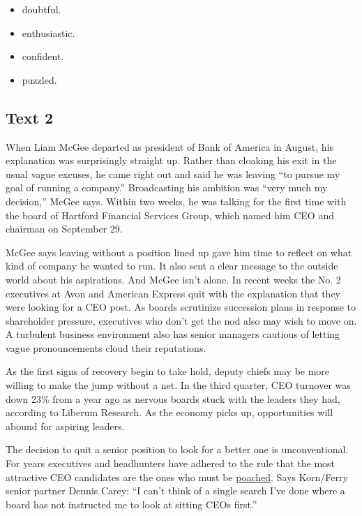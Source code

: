 \documentclass[UTF8,11pt]{ctexart}
\begin{document}
\begin{itemize}[leftmargin=2em,itemsep=.2em,topsep=.4em]\item[A.] doubtful.
\item[B.] enthusiastic.
\item[C.] confident.
\item[D.] puzzled.
\end{itemize}

\subsection*{\textbf{Text 2}}


When Liam McGee departed as president of Bank of America in August, his explanation was surprisingly straight up. Rather than cloaking his exit in the usual vague excuses, he came right out and said he was leaving “to pursue my goal of running a company.” Broadcasting his ambition was “very much my decision,” McGee says. Within two weeks, he was talking for the first time with the board of Hartford Financial Services Group, which named him CEO and chairman on September 29.


McGee says leaving without a position lined up gave him time to reflect on what kind of company he wanted to run. It also sent a clear message to the outside world about his aspirations. And McGee isn't alone. In recent weeks the No. 2 executives at Avon and American Express quit with the explanation that they were looking for a CEO post. As boards scrutinize succession plans in response to shareholder pressure, executives who don't get the nod also may wish to move on. A turbulent business environment also has senior managers cautious of letting vague pronouncements cloud their reputations.


As the first signs of recovery begin to take hold, deputy chiefs may be more willing to make the jump without a net. In the third quarter, CEO turnover was down 23\% from a year ago as nervous boards stuck with the leaders they had, according to Liberum Research. As the economy picks up, opportunities will abound for aspiring leaders.


The decision to quit a senior position to look for a better one is unconventional. For years executives and headhunters have adhered to the rule that the most attractive CEO candidates are the ones who must be \uline{poached}. Says Korn/Ferry senior partner Dennis Carey: “I can't think of a single search I've done where a board has not instructed me to look at sitting CEOs first.”
\end{document}
